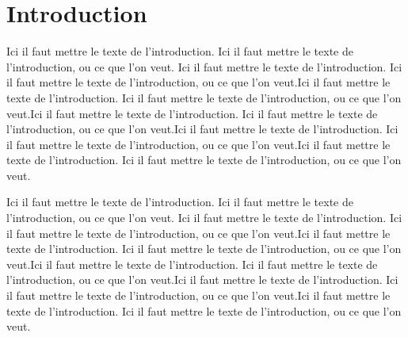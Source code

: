 \chapter{Introduction}

Ici il faut mettre le texte de l'introduction. Ici il faut mettre le texte de l'introduction, ou ce que l'on veut. Ici il faut mettre le texte de l'introduction. Ici il faut mettre le texte de l'introduction, ou ce que l'on veut.Ici il faut mettre le texte de l'introduction. Ici il faut mettre le texte de l'introduction, ou ce que l'on veut.Ici il faut mettre le texte de l'introduction. Ici il faut mettre le texte de l'introduction, ou ce que l'on veut.Ici il faut mettre le texte de l'introduction. Ici il faut mettre le texte de l'introduction, ou ce que l'on veut.Ici il faut mettre le texte de l'introduction. Ici il faut mettre le texte de l'introduction, ou ce que l'on veut.

Ici il faut mettre le texte de l'introduction. Ici il faut mettre le texte de l'introduction, ou ce que l'on veut. Ici il faut mettre le texte de l'introduction. Ici il faut mettre le texte de l'introduction, ou ce que l'on veut.Ici il faut mettre le texte de l'introduction. Ici il faut mettre le texte de l'introduction, ou ce que l'on veut.Ici il faut mettre le texte de l'introduction. Ici il faut mettre le texte de l'introduction, ou ce que l'on veut.Ici il faut mettre le texte de l'introduction. Ici il faut mettre le texte de l'introduction, ou ce que l'on veut.Ici il faut mettre le texte de l'introduction. Ici il faut mettre le texte de l'introduction, ou ce que l'on veut.

\clearpage
